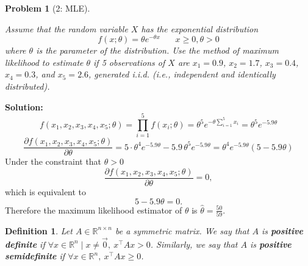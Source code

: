 \documentclass[11pt]{exam}
\theoremstyle{quest}
\newtheorem*{definition}{Definition}
\newtheorem*{question}{Problem}
\begin{document}
\begin{question}[2: MLE]
~

Assume that the random variable $X$ has the exponential distribution
\[
f(x;\theta) = \theta e^{-\theta x} \ \ \ \ \ \ \ \ x \geq 0, \theta > 0
\]
where $\theta$ is the parameter of the distribution. Use the method of maximum
likelihood to estimate $\theta$ if 5 observations of $X$ are $x_1 = 0.9$, $x_2 =
1.7$, $x_3 = 0.4$, $x_4 = 0.3$, and $x_5 = 2.6$, generated i.i.d. (i.e.,
independent and identically distributed).
\end{question}
\textbf{Solution:}
\[
f(x_1,x_2,x_3,x_4,x_5;\theta) = \prod_{i=1}^{5} f(x_i ; \theta) = \theta^5 e^{-\theta \sum_{i=1}^5 x_i} = \theta^5 e^{- 5.9 \theta }
\]
\[
\frac{\partial f(x_1,x_2,x_3,x_4,x_5; \theta)}{\partial \theta} = 5 \cdot \theta^4 e^{-5.9 \theta} - 5.9 \, \theta^5 e^{- 5.9 \theta} = \theta^4 e^{-5.9 \theta}(5 - 5.9\theta)
\]
Under the constraint that $\theta > 0$
\[
\frac{\partial f(x_1,x_2,x_3,x_4,x_5; \theta)}{\partial \theta} = 0,
\]
which is equivalent to 
\[
5 - 5.9\theta = 0.
\]
Therefore the maximum likelihood estimator of $\theta$ is $\hat{\theta} = \frac{50}{59}$.

\newpage


\begin{definition}
Let $A \in \mathbb{R}^{n \times n}$ be a symmetric matrix. We say that $A$ is
\textbf{positive definite} if $\forall x\in \mathbb{R}^n \mid x \neq \vec{0},\ x^\top Ax >
0$. Similarly, we say that $A$ is \textbf{positive semidefinite} if $\forall x
\in \mathbb{R}^n,\ x^\top Ax \geq 0$.
\end{definition}

\bigskip
\end{document}

